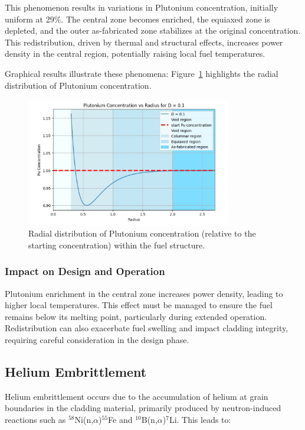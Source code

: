 \documentclass[11pt,a4paper,twoside]{article}
\begin{document}
This phenomenon results in variations in Plutonium concentration, initially uniform at 29\%. The central zone becomes enriched, the equiaxed zone is depleted, and the outer as-fabricated zone stabilizes at the original concentration. This redistribution, driven by thermal and structural effects, increases power density in the central region, potentially raising local fuel temperatures.

Graphical results illustrate these phenomena: Figure~\ref{fig:Pu_Profile} highlights the radial distribution of Plutonium concentration.

\begin{figure}[H]
\centering
\includegraphics[width=0.8\textwidth]{Pu_redistribution_profile.jpg}
\caption{Radial distribution of Plutonium concentration (relative to the starting concentration) within the fuel structure.}
\label{fig:Pu_Profile}
\end{figure}

\subsubsection*{Impact on Design and Operation}
Plutonium enrichment in the central zone increases power density, leading to higher local temperatures. This effect must be managed to ensure the fuel remains below its melting point, particularly during extended operation. Redistribution can also exacerbate fuel swelling and impact cladding integrity, requiring careful consideration in the design phase.

\subsection{Helium Embrittlement}

Helium embrittlement occurs due to the accumulation of helium at grain boundaries in the cladding material, primarily produced by neutron-induced reactions such as $^{58}$Ni(n,$\alpha$)$^{55}$Fe and $^{10}$B(n,$\alpha$)$^{7}$Li. This leads to:
\end{document}
